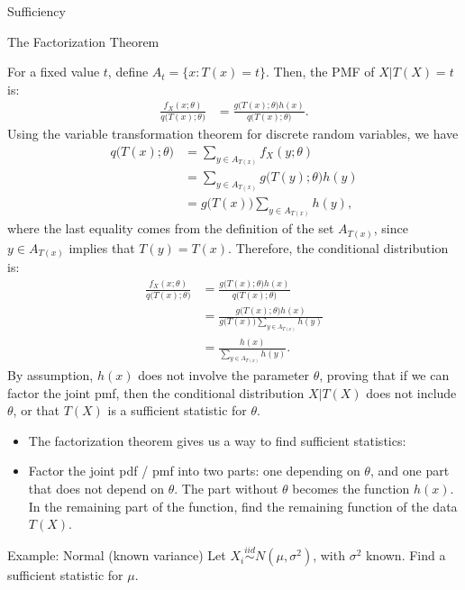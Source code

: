\begin{frame}[allowframebreaks]{Sufficiency}
\begin{block}{The Factorization Theorem}
{    For a fixed value $t$, define $A_t = \{x: T(x) = t\}$. Then, the PMF of $X | T(X) = t$ is:
    \begin{align*}
      \frac{f_X(x; \theta)}{q\big(T(x); \theta\big)} &= \frac{g\big(T(x) ; \theta\big)h(x)}{q\big(T(x);\theta\big)}.
    \end{align*}
    Using the variable transformation theorem for discrete random variables, we have
    \begin{align*}
    q\big(T(x); \theta\big) &= \sum_{y \in A_{T(x)}} f_X(y;\theta) \\
    &= \sum_{y \in A_{T(x)}} g\big(T(y) ; \theta\big)h(y) \\
    &= g\big(T(x)\big) \sum_{y \in A_{T(x)}} h(y),
    \end{align*}
    where the last equality comes from the definition of the set $A_{T(x)}$, since $y \in A_{T(x)}$ implies that $T(y) = T(x)$.
    Therefore, the conditional distribution is:
        \begin{align*}
      \frac{f_X(x; \theta)}{q\big(T(x); \theta\big)} &= \frac{g\big(T(x) ; \theta\big)h(x)}{q\big(T(x);\theta\big)} \\
      &= \frac{g\big(T(x) ; \theta\big)h(x)}{g\big(T(x)\big) \sum_{y \in A_{T(x)}} h(y)} \\
      &= \frac{h(x)}{\sum_{y \in A_{T(x)}} h(y)}.
    \end{align*}
    By assumption, $h(x)$ does not involve the parameter $\theta$, proving that if we can factor the joint pmf, then the conditional distribution $X | T(X)$ does not include $\theta$, or that $T(X)$ is a sufficient statistic for $\theta$.

  }

\end{block}

\framebreak

\begin{itemize}
  \item The factorization theorem gives us a way to find sufficient statistics:
  \item Factor the joint pdf / pmf into two parts: one depending on $\theta$, and one part that does not depend on $\theta$. The part without $\theta$ becomes the function $h(x)$. In the remaining part of the function, find the remaining function of the data $T(X)$.
\end{itemize}

\begin{exampleblock}{Example: Normal (known variance)}
  Let $X_i \overset{iid}{\sim} N(\mu, \sigma^2)$, with $\sigma^2$ known. Find a sufficient statistic for $\mu$.


\end{exampleblock}
\end{frame}
